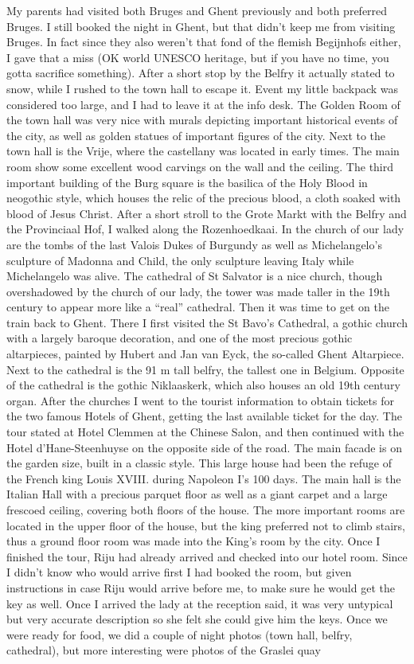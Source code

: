 My parents had visited both Bruges and Ghent previously and both preferred Bruges. I still booked the night in Ghent, but that didn't keep me from visiting Bruges. In fact since they also weren't that fond of the flemish Begijnhofs either, I gave that a miss (OK world UNESCO heritage, but if you have no time, you gotta sacrifice something). After a short stop by the Belfry it actually stated to snow, while I rushed to the town hall to escape it. Event my little backpack was considered too large, and I had to leave it at the info desk. The Golden Room of the town hall was very nice with murals depicting important historical events of the city, as well as golden statues of important figures of the city. Next to the town hall is the Vrije, where the castellany was located in early times. The main room show some excellent wood carvings on the wall and the ceiling. The third important building of the Burg square is the basilica of the Holy Blood in neogothic style, which houses the relic of the precious blood, a cloth soaked with blood of Jesus Christ. After a short stroll to the Grote Markt with the Belfry and the Provinciaal Hof, I walked along the Rozenhoedkaai. In the church of our lady are the tombs of the last Valois Dukes of Burgundy as well as Michelangelo's sculpture of Madonna and Child, the only sculpture leaving Italy while Michelangelo was alive. The cathedral of St Salvator is a nice church, though overshadowed by the church of our lady, the tower was made taller in the 19th century to appear more like a ``real'' cathedral. Then it was time to get on the train back to Ghent. There I first visited the St Bavo's Cathedral, a gothic church with a largely baroque decoration, and one of the most precious gothic altarpieces, painted by Hubert and Jan van Eyck, the so-called Ghent Altarpiece. Next to the cathedral is the 91 m tall belfry, the tallest one in Belgium. Opposite of the cathedral is the gothic Niklaaskerk, which also houses an old 19th century organ. After the churches I went to the tourist information to obtain tickets for the two famous Hotels of Ghent, getting the last available ticket for the day. The tour stated at Hotel Clemmen at the Chinese Salon, and then continued with the Hotel d'Hane-Steenhuyse on the opposite side of the road. The main facade is on the garden size, built in a classic style. This large house had been the refuge of the French king Louis XVIII. during Napoleon I's 100 days. The main hall is the Italian Hall with a precious parquet floor as well as a giant carpet and a large frescoed ceiling, covering both floors of the house. The more important rooms are located in the upper floor of the house, but the king preferred not to climb stairs, thus a ground floor room was made into the King's room by the city. Once I finished the tour, Riju had already arrived and checked into our hotel room. Since I didn't know who would arrive first I had booked the room, but given instructions in case Riju would arrive before me, to make sure he would get the key as well. Once I arrived the lady at the reception said, it was very untypical but very accurate description so she felt she could give him the keys. Once we were ready for food, we did a couple of night photos (town hall, belfry, cathedral), but more interesting were photos of the Graslei quay 